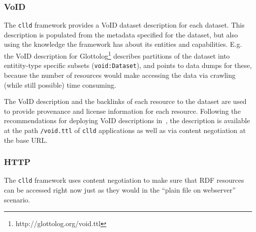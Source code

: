 \documentclass[a4paper,10pt]{article}
\begin{document}
\subsubsection{VoID}
\label{sec:void}
The \texttt{clld} framework provides a VoID dataset description for each dataset. This description is populated from
the metadata specified for the dataset, but also using the knowledge the framework has about its entities and capabilities.
E.g. the VoID description for Glottolog\footnote{http://glottolog.org/void.ttl} describes
partitions of the dataset into entitity-type specific subsets (\texttt{void:Dataset}),
and points to data dumps for these, because the number of resources would make accessing
the data via crawling (while still possible) time consuming.

The VoID description and the backlinks of each resource to the dataset are used to provide
provenance and license information for each resource. Following the recommendations for
deploying VoID descriptions in~, the description is available at the path
\texttt{/void.ttl} of \texttt{clld} applications as well as via content negotiation at the base URL.


\subsubsection{HTTP}


The \texttt{clld} framework uses content negotiation %
to make sure that RDF resources can be accessed right now just as they would in the ``plain file on webserver'' scenario.
\end{document}
